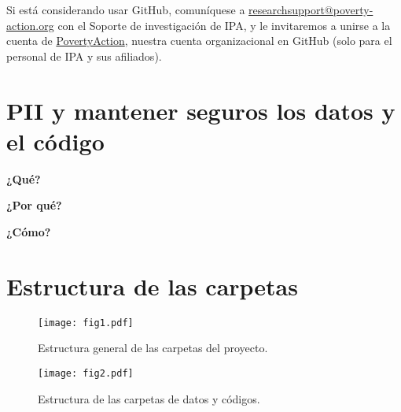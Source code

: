 \documentclass[11pt,en]{elegantpaper}
\begin{document}
Si está considerando usar GitHub, comuníquese a \href{mailto:researchsupport@poverty-action.org}{researchsupport@poverty-action.org} con el Soporte de investigación de IPA, y le invitaremos a unirse a la cuenta de \href{https://github.com/PovertyAction}{PovertyAction}, nuestra cuenta organizacional en GitHub (solo para el personal de IPA y sus afiliados).

\section{PII y mantener seguros los datos y el código}
\label{sec:pii}
\textbf{¿Qué?}


\textbf{¿Por qué?}


\textbf{¿Cómo?} 

\newpage 
\appendix 
\section{Estructura de las carpetas}
\label{sec:appendix}
\begin{figure}[htbp]
	\centering
	\caption{Estructura general de las carpetas del proyecto.\label{fig:carpetas}}
	\texttt{[image: fig1.pdf]}
\end{figure}


\begin{figure}[htbp]
	\centering
	\caption{Estructura de las carpetas de datos y códigos. \label{fig:code}}
	\texttt{[image: fig2.pdf]}
\end{figure}
\end{document}
